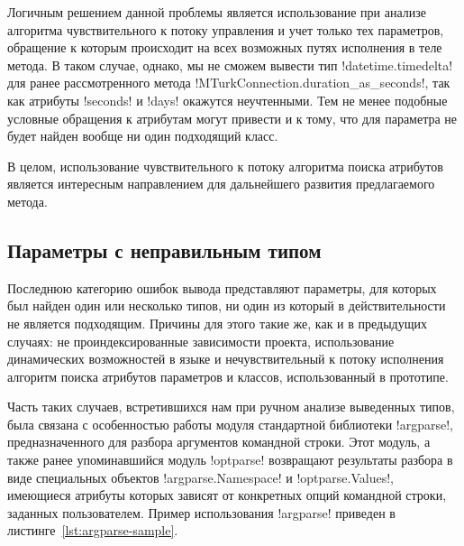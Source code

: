 Логичным решением данной проблемы является использование при анализе алгоритма
чувствительного к потоку управления и учет только тех параметров, обращение к
которым происходит на всех возможных путях исполнения в теле метода. В таком
случае, однако, мы не сможем вывести тип !datetime.timedelta! для ранее
рассмотренного метода !MTurkConnection.duration_as_seconds!, так как атрибуты
!seconds! и !days! окажутся неучтенными. Тем не менее подобные условные обращения
к атрибутам могут привести и к тому, что для параметра не будет найден вообще ни
один подходящий класс. 

В целом, использование чувствительного к потоку алгоритма поиска
атрибутов является интересным направлением для дальнейшего развития
предлагаемого метода.

\subsection{Параметры с неправильным типом}
\label{sub:unsound-incomplete}

Последнюю категорию ошибок вывода представляют параметры, для которых был найден
один или несколько типов, ни один из который в действительности не является
подходящим. Причины для этого такие же, как и в предыдущих случаях:
не проиндексированные зависимости проекта, использование динамических
возможностей в языке и нечувствительный к потоку исполнения алгоритм поиска
атрибутов параметров и классов, использованный в прототипе. 


Часть таких случаев, встретившихся нам при ручном анализе выведенных типов, была
связана с особенностью работы модуля стандартной библиотеки !argparse!,
предназначенного для разбора аргументов командной строки.
Этот модуль, а также ранее упоминавшийся модуль !optparse! возвращают результаты
разбора в виде специальных объектов !argparse.Namespace! и !optparse.Values!,
имеющиеся атрибуты которых зависят от конкретных опций командной строки,
заданных пользователем. Пример использования !argparse! приведен в
листинге~\ref{lst:argparse-sample}.

